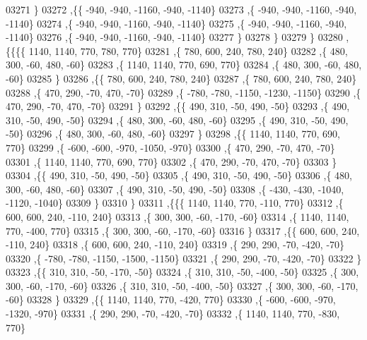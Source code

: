 \begin{DoxyCode}
03271     \}
03272    ,\{\{  -940,  -940, -1160,  -940, -1140\}
03273     ,\{  -940,  -940, -1160,  -940, -1140\}
03274     ,\{  -940,  -940, -1160,  -940, -1140\}
03275     ,\{  -940,  -940, -1160,  -940, -1140\}
03276     ,\{  -940,  -940, -1160,  -940, -1140\}
03277     \}
03278    \}
03279   \}
03280  ,\{\{\{\{  1140,  1140,   770,   780,   770\}
03281     ,\{   780,   600,   240,   780,   240\}
03282     ,\{   480,   300,   -60,   480,   -60\}
03283     ,\{  1140,  1140,   770,   690,   770\}
03284     ,\{   480,   300,   -60,   480,   -60\}
03285     \}
03286    ,\{\{   780,   600,   240,   780,   240\}
03287     ,\{   780,   600,   240,   780,   240\}
03288     ,\{   470,   290,   -70,   470,   -70\}
03289     ,\{  -780,  -780, -1150, -1230, -1150\}
03290     ,\{   470,   290,   -70,   470,   -70\}
03291     \}
03292    ,\{\{   490,   310,   -50,   490,   -50\}
03293     ,\{   490,   310,   -50,   490,   -50\}
03294     ,\{   480,   300,   -60,   480,   -60\}
03295     ,\{   490,   310,   -50,   490,   -50\}
03296     ,\{   480,   300,   -60,   480,   -60\}
03297     \}
03298    ,\{\{  1140,  1140,   770,   690,   770\}
03299     ,\{  -600,  -600,  -970, -1050,  -970\}
03300     ,\{   470,   290,   -70,   470,   -70\}
03301     ,\{  1140,  1140,   770,   690,   770\}
03302     ,\{   470,   290,   -70,   470,   -70\}
03303     \}
03304    ,\{\{   490,   310,   -50,   490,   -50\}
03305     ,\{   490,   310,   -50,   490,   -50\}
03306     ,\{   480,   300,   -60,   480,   -60\}
03307     ,\{   490,   310,   -50,   490,   -50\}
03308     ,\{  -430,  -430, -1040, -1120, -1040\}
03309     \}
03310    \}
03311   ,\{\{\{  1140,  1140,   770,  -110,   770\}
03312     ,\{   600,   600,   240,  -110,   240\}
03313     ,\{   300,   300,   -60,  -170,   -60\}
03314     ,\{  1140,  1140,   770,  -400,   770\}
03315     ,\{   300,   300,   -60,  -170,   -60\}
03316     \}
03317    ,\{\{   600,   600,   240,  -110,   240\}
03318     ,\{   600,   600,   240,  -110,   240\}
03319     ,\{   290,   290,   -70,  -420,   -70\}
03320     ,\{  -780,  -780, -1150, -1500, -1150\}
03321     ,\{   290,   290,   -70,  -420,   -70\}
03322     \}
03323    ,\{\{   310,   310,   -50,  -170,   -50\}
03324     ,\{   310,   310,   -50,  -400,   -50\}
03325     ,\{   300,   300,   -60,  -170,   -60\}
03326     ,\{   310,   310,   -50,  -400,   -50\}
03327     ,\{   300,   300,   -60,  -170,   -60\}
03328     \}
03329    ,\{\{  1140,  1140,   770,  -420,   770\}
03330     ,\{  -600,  -600,  -970, -1320,  -970\}
03331     ,\{   290,   290,   -70,  -420,   -70\}
03332     ,\{  1140,  1140,   770,  -830,   770\}

\end{DoxyCode}
